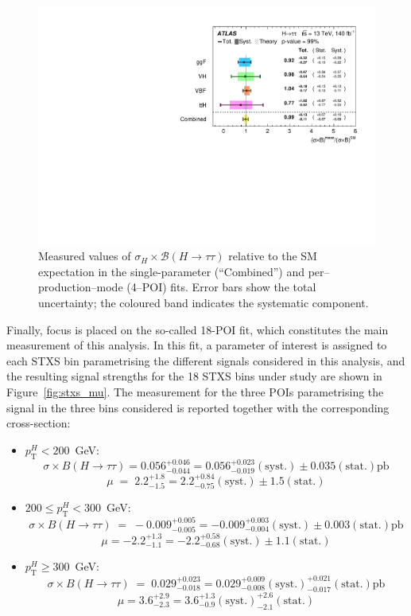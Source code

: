 \begin{figure}[htbp]
  \centering
  \includegraphics[width=0.75\linewidth]{images/fit_stxs/4_poi_stxs.pdf} %
  \caption{Measured values of \(\sigma_H \times \mathcal{B}(H\!\to\!\tau\tau)\) relative to the SM expectation
  in the single-parameter (``Combined'') and per–production–mode (4–POI) fits.
  Error bars show the total uncertainty; the coloured band indicates the systematic component.}
  \label{fig:permode_mu}
\end{figure}


Finally, focus is placed on the so-called 18-POI fit, which constitutes the main measurement of this analysis. In this fit, a parameter of interest is assigned to each STXS bin parametrising the different signals considered in this \htautau analysis, and the resulting signal strengths for the 18 STXS bins under study are shown in Figure~\ref{fig:stxs_mu}.
The measurement for the three POIs parametrising the \ttH signal in the three \pth bins considered is reported together with the corresponding cross-section:
\begin{itemize}
  \small
  \item $p_{\text{T}}^{H} < 200$~GeV:  
  \[
  \sigma \times B(H \to \tau\tau)=0.056^{+0.046}_{-0.044} 
  = 0.056^{+0.023}_{-0.019}(\text{syst.})\pm 0.035(\text{stat.})\text{pb}
  \]
  \[
  \mu \;=\; 2.2^{+1.8}_{-1.5}=2.2^{+0.84}_{-0.75}(\text{syst.})\pm 1.5(\text{stat.})
  \]
  \item $200 \leq p_{\text{T}}^{H} < 300$~GeV:  
  \[
  \sigma \times B(H \to \tau\tau) \;=\; -0.009^{+0.005}_{-0.005} 
  = -0.009^{+0.003}_{-0.004}(\text{syst.})\pm 0.003(\text{stat.}) \text{pb}
  \]
  \[
  \mu=-2.2^{+1.3}_{-1.1}=-2.2^{+0.58}_{-0.68}(\text{syst.})\pm 1.1(\text{stat.})
  \]
  \item $p_{\text{T}}^{H} \geq 300$~GeV:  
  \[
  \sigma \times B(H \to \tau\tau) \;=\; 0.029^{+0.023}_{-0.018} 
  = 0.029^{+0.009}_{-0.008}(\text{syst.})^{+0.021}_{-0.017}(\text{stat.})\text{pb}
  \]
  \[
  \mu=3.6^{+2.9}_{-2.3}=3.6^{+1.3}_{-0.9}(\text{syst.})^{+2.6}_{-2.1}(\text{stat.})
  \]
\end{itemize}

